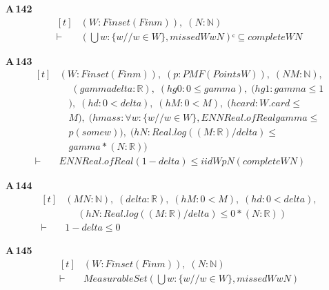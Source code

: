 \noindent\textbf{A\,142}\quad{}
{\footnotesize\[ \begin{aligned}[t]
&(\mathit{W} : \mathit{Finset} (\mathit{Fin} \mathit{m})),\; (\mathit{N} : \mathbb{N} )\\
\vdash\;&(⋃ \mathit{w} : \{ \mathit{w} // \mathit{w} \in \mathit{W}\} , \mathit{missed} \mathit{W} \mathit{w} \mathit{N})ᶜ \subseteq \mathit{complete} \mathit{W} \mathit{N}
\end{aligned} \]}

\noindent\textbf{A\,143}\quad{}
{\footnotesize\[ \begin{aligned}[t]
&(\mathit{W} : \mathit{Finset} (\mathit{Fin} \mathit{m})),\; (\mathit{p} : \mathit{PMF} (\mathit{Points} \mathit{W})),\; (\mathit{N} \mathit{M} : \mathbb{N} ),\\
&\quad \; (\mathit{gamma} \mathit{delta} : \mathbb{R} ),\; (\mathit{hg0} : 0 \leq \mathit{gamma}),\; (\mathit{hg1} : \mathit{gamma} \leq 1\\
&\quad ),\; (\mathit{hd} : 0 < \mathit{delta}),\; (\mathit{hM} : 0 < \mathit{M}),\; (\mathit{hcard} : \mathit{W}.\mathit{card} \leq\\
&\quad \mathit{M}),\; (\mathit{hmass} : \forall \mathit{w} : \{ \mathit{w} // \mathit{w} \in \mathit{W}\} , \mathit{ENNReal}.\mathit{ofReal} \mathit{gamma} \leq\\
&\quad \mathit{p} (\mathit{some} \mathit{w})),\; (\mathit{hN} : \mathit{Real}.\mathit{log} ((\mathit{M}:\mathbb{R} )/\mathit{delta}) \leq\\
&\quad \mathit{gamma}*(\mathit{N}:\mathbb{R} ))\\
\vdash\;&\mathit{ENNReal}.\mathit{ofReal} (1-\mathit{delta}) \leq \mathit{iid} \mathit{W} \mathit{p} \mathit{N} (\mathit{complete} \mathit{W} \mathit{N})
\end{aligned} \]}

\noindent\textbf{A\,144}\quad{}
{\footnotesize\[ \begin{aligned}[t]
&(\mathit{M} \mathit{N} : \mathbb{N} ),\; (\mathit{delta} : \mathbb{R} ),\; (\mathit{hM} : 0 < \mathit{M}),\; (\mathit{hd} : 0 < \mathit{delta}),\\
&\quad \; (\mathit{hN} : \mathit{Real}.\mathit{log} ((\mathit{M}:\mathbb{R} )/\mathit{delta}) \leq 0*(\mathit{N}:\mathbb{R} ))\\
\vdash\;&1 - \mathit{delta} \leq 0
\end{aligned} \]}

\noindent\textbf{A\,145}\quad{}
{\footnotesize\[ \begin{aligned}[t]
&(\mathit{W} : \mathit{Finset} (\mathit{Fin} \mathit{m})),\; (\mathit{N} : \mathbb{N} )\\
\vdash\;&\mathit{MeasurableSet} (⋃ \mathit{w} : \{ \mathit{w} // \mathit{w} \in \mathit{W}\} , \mathit{missed} \mathit{W} \mathit{w} \mathit{N})
\end{aligned} \]}


